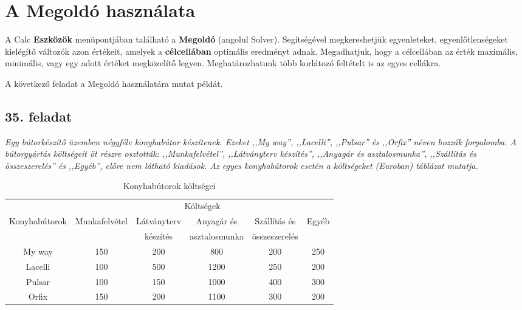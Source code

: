 \chapter{A Megoldó használata}
\thispagestyle{empty}

A Calc \textbf{Eszközök} menüpontjában található a
\textbf{Megoldó} (angolul Solver). Segítségével megkereshetjük egyenleteket, egyenlőtlenségeket kielégítő változók azon értékeit,
amelyek a \textbf{célcellában} optimális eredményt adnak. Megadhatjuk, hogy a célcellában az érték maximális, minimális, vagy egy adott értéket megközelítő legyen. Meghatározhatunk több
 korlátozó feltételt is az egyes cellákra.

A következő feladat a Megoldó használatára mutat példát.


\section{35. feladat}

{\itshape
Egy bútorkészítő üzemben
négyféle konyhabútor készítenek. Ezeket ,,My way'', ,,Lacelli'',
,,Pulsar'' és ,,Orfix'' néven hozzák forgalomba. A
bútorgyártás költségeit öt részre osztották: ,,Munkafelvétel'',
,,Látványterv készítés'', ,,Anyagár és asztalosmunka'',
,,Szállítás és összeszerelés'' és ,,Egyéb'', előre nem látható
kiadások. Az egyes konyhabútorok esetén a költségeket
(Euroban)  táblázat mutatja.}

\begin{table}[!h]
\begin{center}
\caption{Konyhabútorok költségei}\label{Költségek}
\begin{tabular}{|c|c|c|c|c|c|}
\hline
 & \multicolumn{5}{c|}{Költségek}\\ \cline{2-6}
Konyhabútorok & Munkafelvétel & Látványterv & Anyagár és &
Szállítás és & Egyéb\\ 
 & & készítés & asztalosmunka & összeszerelés & \\ \hline
My way & 150 & 200 & 800 & 200 & 250\\ \hline
Lacelli & 100 & 500 & 1200 & 250 & 200\\ \hline
Pulsar & 100 & 150 & 1000 & 400 & 300\\ \hline
Orfix & 150 & 200 & 1100 & 300 & 200\\ \hline
\end{tabular}
\end{center}
\end{table}

